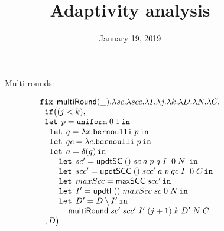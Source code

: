 \documentclass[a4paper,11pt]{article}
\title{Adaptivity analysis}
\author{}
\date{January 19, 2019}
\theoremstyle{definition}
\begin{document}
\maketitle


\newpage
\begin{figure}

Multi-rounds:

\[
\begin{array}{l}
 \mathop{\mathtt{fix}} \;  \mathsf{multiRound}(\_). \lambda sc. \lambda scc. \lambda
  I. \lambda j. \lambda k. \lambda D. \lambda N. \lambda C. \\
 \hspace{.2cm} \mathtt{if}   \big (   (j < k)  ,  \\
  \hspace{.2cm} \mathop{\mathtt{let}} \; p = \mathtt{uniform} \; 0 \; 1 \mathop{ \mathtt{in}} \\
  \hspace{0.4cm} \mathop{\mathtt{let}} \; q = \lambda x. \mathtt{bernoulli} \; p \mathop{ \mathtt{in}} \\
 \hspace{0.4cm} \mathop{\mathtt{let}} \; qc = \lambda c. \mathtt{bernoulli} \; p \mathop{ \mathtt{in}} \\
 \hspace{0.4cm} \mathop{\mathtt{let}} \; a = \delta (q)  \mathop{ \mathtt{in}} \\
 \hspace{0.8cm} \mathop{\mathtt{let}} \; sc' =  \mathsf{updtSC} \; () \; sc  \; a \; p
 \; q \; I \;  \; 0 \;  N
  \;  \mathop{ \mathtt{in}} \\
\hspace{0.8cm} \mathop{\mathtt{let}} \; scc' =  \mathsf{updtSCC} \; () \; scc' \; a \; p
 \; qc \; I \;  \; 0 \;  C \mathop{ \mathtt{in}} \\
\hspace{0.8cm} \mathop{\mathtt{let}} \; maxScc =  \mathsf{maxSCC} \; scc' \mathop{ \mathtt{in}} \\
\hspace{0.8cm} \mathop{\mathtt{let}} \; I' =  \mathsf{updtI}  \; () \; maxScc \; sc
  \; 0 \; N  \mathop{ \mathtt{in}} \\
  \hspace{0.8cm} \mathop{\mathtt{let}} \; D' =  D \setminus I' \mathop{ \mathtt{in}} \\
  \hspace{1.2cm} \mathsf{multiRound}  \; sc' \; scc' \; I'
  \; (j+1) \;  k \; D' \; N \; C\\ 
\hspace{0.2cm}   ,     D  \big ) \\
 
\end{array}
\]


\end{figure}
\end{document}
